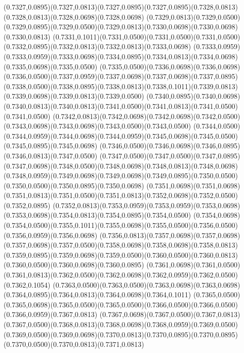 (0.7327,0.0895)(0.7327,0.0813)(0.7327,0.0895)(0.7327,0.0895)(0.7328,0.0813)(0.7328,0.0813)(0.7328,0.0698)(0.7328,0.0698)
(0.7329,0.0813)(0.7329,0.0500)(0.7329,0.0895)(0.7329,0.0500)(0.7329,0.0813)(0.7330,0.0698)(0.7330,0.0698)(0.7330,0.0813)
(0.7331,0.1011)(0.7331,0.0500)(0.7331,0.0500)(0.7331,0.0500)(0.7332,0.0895)(0.7332,0.0813)(0.7332,0.0813)(0.7333,0.0698)
(0.7333,0.0959)(0.7333,0.0959)(0.7333,0.0698)(0.7334,0.0895)(0.7334,0.0813)(0.7334,0.0698)(0.7335,0.0698)(0.7335,0.0500)
(0.7335,0.0500)(0.7336,0.0698)(0.7336,0.0698)(0.7336,0.0500)(0.7337,0.0959)(0.7337,0.0698)(0.7337,0.0698)(0.7337,0.0895)
(0.7338,0.0500)(0.7338,0.0895)(0.7338,0.0813)(0.7338,0.1011)(0.7339,0.0813)(0.7339,0.0698)(0.7339,0.0813)(0.7339,0.0500)
(0.7340,0.0895)(0.7340,0.0698)(0.7340,0.0813)(0.7340,0.0813)(0.7341,0.0500)(0.7341,0.0813)(0.7341,0.0500)(0.7341,0.0500)
(0.7342,0.0813)(0.7342,0.0698)(0.7342,0.0698)(0.7342,0.0500)(0.7343,0.0698)(0.7343,0.0698)(0.7343,0.0500)(0.7343,0.0500)
(0.7344,0.0500)(0.7344,0.0959)(0.7344,0.0698)(0.7344,0.0959)(0.7345,0.0698)(0.7345,0.0500)(0.7345,0.0895)(0.7345,0.0698)
(0.7346,0.0500)(0.7346,0.0698)(0.7346,0.0895)(0.7346,0.0813)(0.7347,0.0500)
\PST@Solid(0.7347,0.0500)(0.7347,0.0500)(0.7347,0.0895)(0.7347,0.0698)(0.7348,0.0500)(0.7348,0.0698)(0.7348,0.0813)(0.7348,0.0698)
(0.7348,0.0959)(0.7349,0.0698)(0.7349,0.0698)(0.7349,0.0895)(0.7350,0.0500)(0.7350,0.0500)(0.7350,0.0895)(0.7350,0.0698)
(0.7351,0.0698)(0.7351,0.0698)(0.7351,0.0813)(0.7351,0.0500)(0.7351,0.0813)(0.7352,0.0698)(0.7352,0.0500)(0.7352,0.0895)
(0.7352,0.0813)(0.7353,0.0959)(0.7353,0.0959)(0.7353,0.0698)(0.7353,0.0698)(0.7354,0.0813)(0.7354,0.0895)(0.7354,0.0500)
(0.7354,0.0698)(0.7354,0.0500)(0.7355,0.1011)(0.7355,0.0698)(0.7355,0.0500)(0.7356,0.0500)(0.7356,0.0959)(0.7356,0.0698)
(0.7356,0.0813)(0.7357,0.0698)(0.7357,0.0698)(0.7357,0.0698)(0.7357,0.0500)(0.7358,0.0698)(0.7358,0.0698)(0.7358,0.0813)
(0.7359,0.0895)(0.7359,0.0698)(0.7359,0.0500)(0.7360,0.0500)(0.7360,0.0813)(0.7360,0.0500)(0.7360,0.0698)(0.7360,0.0895)
(0.7361,0.0698)(0.7361,0.0500)(0.7361,0.0813)(0.7362,0.0500)(0.7362,0.0698)(0.7362,0.0959)(0.7362,0.0500)(0.7362,0.1054)
(0.7363,0.0500)(0.7363,0.0500)(0.7363,0.0698)(0.7363,0.0698)(0.7364,0.0895)(0.7364,0.0813)(0.7364,0.0698)(0.7364,0.1011)
(0.7365,0.0500)(0.7365,0.0698)(0.7365,0.0500)(0.7365,0.0500)(0.7366,0.0500)(0.7366,0.0500)(0.7366,0.0959)(0.7367,0.0813)
(0.7367,0.0698)(0.7367,0.0500)(0.7367,0.0813)(0.7367,0.0500)(0.7368,0.0813)(0.7368,0.0698)(0.7368,0.0959)(0.7369,0.0500)
(0.7369,0.0500)(0.7369,0.0698)(0.7370,0.0813)(0.7370,0.0895)(0.7370,0.0895)(0.7370,0.0500)(0.7370,0.0813)(0.7371,0.0813)
